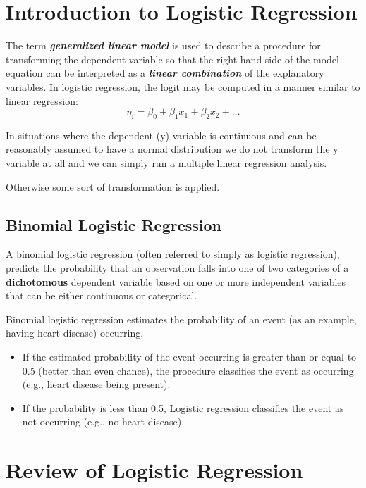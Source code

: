 \documentclass[a4paper,12pt]{article}
\begin{document}
\section*{Introduction to Logistic Regression}

The term \textbf{\textit{generalized linear model}} is used to describe a procedure for
transforming the dependent variable so that the right hand side of the model
equation can be interpreted as a \textbf{\textit{linear combination}} of the explanatory variables. 	In logistic regression, the logit may be computed in a manner similar to linear regression:
\[ \eta_i = \beta_0 + \beta_1x_1 + \beta_2x_2 + \ldots  \]

In situations where the dependent (y) variable is continuous and can be
reasonably assumed to have a normal distribution we do not transform the y
variable at all and we can simply run a multiple linear regression analysis.

Otherwise some sort of transformation is applied.


\subsection{Binomial Logistic Regression} 
A binomial logistic regression (often referred to simply as logistic regression), predicts the probability that an observation falls into one of two categories of a \textbf{dichotomous} dependent variable based on one or more independent variables that can be either continuous or categorical.

Binomial logistic regression estimates the probability of an event (as an example, having heart disease) occurring. 
\begin{itemize}
	\item If the estimated probability of the event occurring is greater than or equal to 0.5 (better than even chance), the procedure classifies the event as occurring (e.g., heart disease being present). \item If the probability is less than 0.5, Logistic regression classifies the event as not occurring (e.g., no heart disease). 
\end{itemize}


\section{Review of Logistic Regression}
\end{document}
